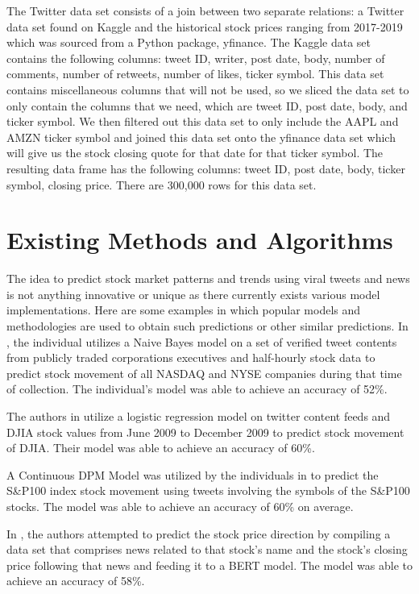 \documentclass[conference]{IEEEtran}
\begin{document}
The Twitter data set consists of a join between two separate relations: a Twitter data set found on Kaggle and the historical stock prices ranging from 2017-2019 which was sourced from a Python package, yfinance. The Kaggle data set contains the following columns: tweet ID, writer, post date, body, number of comments, number of retweets, number of likes, ticker symbol. This data set contains miscellaneous columns that will not be used, so we sliced the data set to only contain the columns that we need, which are tweet ID, post date, body, and ticker symbol. We then filtered out this data set to only include the AAPL and AMZN ticker symbol and joined this data set onto the yfinance data set which will give us the stock closing quote for that date for that ticker symbol. The resulting data frame has the following columns: tweet ID, post date, body, ticker symbol, closing price. There are 300,000 rows for this data set.

\section{Existing Methods and Algorithms}
The idea to predict stock market patterns and trends using viral tweets and news is not anything innovative or unique as there currently exists various model implementations. Here are some examples in which popular models and methodologies are used to obtain such predictions or other similar predictions.
In \cite{b10}, the individual utilizes a Naive Bayes model on a set of verified tweet contents from publicly traded corporations executives and half-hourly stock data to predict stock movement of all NASDAQ and NYSE companies during that time of collection. The individual’s model was able to achieve an accuracy of 52\%.

The authors in \cite{b1} utilize a logistic regression model on twitter content feeds and DJIA stock values from June 2009 to December 2009 to predict stock movement of DJIA. Their model was able to achieve an accuracy of 60\%.

A Continuous DPM Model was utilized by the individuals in \cite{b9} to predict the S&P100 index stock movement using tweets involving the symbols of the S&P100 stocks. The model was able to achieve an accuracy of 60\% on average.

In \cite{b14}, the authors attempted to predict the stock price direction by compiling a data set that comprises news related to that stock’s name and the stock’s closing price following that news and feeding it to a BERT model. The model was able to achieve an accuracy of 58\%.
\end{document}
